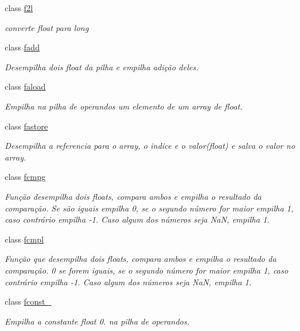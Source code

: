 \begin{DoxyCompactItemize}
class \hyperlink{class_instruction_impl_1_1f2l}{f2l}
\begin{DoxyCompactList}\small\item\em converte float para long \end{DoxyCompactList}\item 
class \hyperlink{class_instruction_impl_1_1fadd}{fadd}
\begin{DoxyCompactList}\small\item\em Desempilha dois float da pilha e empilha adição deles. \end{DoxyCompactList}\item 
class \hyperlink{class_instruction_impl_1_1faload}{faload}
\begin{DoxyCompactList}\small\item\em Empilha na pilha de operandos um elemento de um array de float. \end{DoxyCompactList}\item 
class \hyperlink{class_instruction_impl_1_1fastore}{fastore}
\begin{DoxyCompactList}\small\item\em Desempilha a referencia para o array, o indice e o valor(float) e salva o valor no array. \end{DoxyCompactList}\item 
class \hyperlink{class_instruction_impl_1_1fcmpg}{fcmpg}
\begin{DoxyCompactList}\small\item\em Função desempilha dois floats, compara ambos e empilha o resultado da comparação. Se são iguais empilha 0, se o segundo número for maior empilha 1, caso contrário empilha -\/1. Caso algum dos números seja NaN, empilha 1. \end{DoxyCompactList}\item 
class \hyperlink{class_instruction_impl_1_1fcmpl}{fcmpl}
\begin{DoxyCompactList}\small\item\em Função que desempilha dois floats, compara ambos e empilha o resultado da comparação. 0 se forem iguais, se o segundo número for maior empilha 1, caso contrário empilha -\/1. Caso algum dos números seja NaN, empilha 1. \end{DoxyCompactList}\item 
class \hyperlink{class_instruction_impl_1_1fconst__0}{fconst\+\_}
\begin{DoxyCompactList}\small\item\em Empilha a constante float 0. na pilha de operandos. \end{DoxyCompactList}\item 

\end{DoxyCompactItemize}
